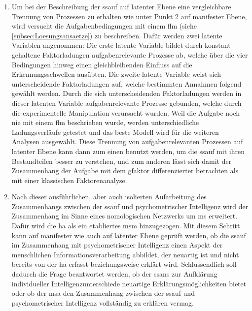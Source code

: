 \documentclass[11pt, twoside, a4paper]{book}		%
\begin{document}
\begin{enumerate}
	\item Um bei der Beschreibung der \gls{ssauf} auf latenter Ebene eine vergleichbare Trennung von Prozessen zu erhalten wie unter Punkt 2 auf manifester Ebene, wird versucht die Aufgabenbedingungen mit einem \gls{flm} (siehe \autoref{subsec:Loesungsansaetze}) zu beschreiben. Dafür werden zwei latente Variablen angenommen: Die erste latente Variable bildet durch konstant gehaltene Faktorladungen aufgabenrelevante Prozesse ab, welche über die vier Bedingungen hinweg einen gleichbleibenden Einfluss auf die Erkennungsschwellen ausübten. Die zweite latente Variable weist sich unterscheidende Faktorladungen auf, welche bestimmten Annahmen folgend gewählt werden. Durch die sich unterscheidenden Faktorladungen werden in dieser latenten Variable aufgabenrelevante Prozesse gebunden, welche durch die experimentelle Manipulation verursacht wurden. Weil die Aufgabe noch nie mit einem \gls{flm} beschrieben wurde, werden unterschiedliche Ladungsverläufe getestet und das beste Modell wird für die weiteren Analysen ausgewählt. Diese Trennung von aufgabenrelevanten Prozessen auf latenter Ebene kann dann zum einen benutzt werden, um die \gls{ssauf} mit ihren Bestandteilen besser zu verstehen, und zum anderen lässt sich damit der Zusammenhang der Aufgabe mit dem \gls{gfaktor} differenzierter betrachten als mit einer klassischen Faktorenanalyse.

	\item Nach dieser ausführlichen, aber auch isolierten Aufarbeitung des Zusammenhangs zwischen der \gls{ssauf} und psychometrischer Intelligenz wird der Zusammenhang im Sinne eines nomologischen Netzwerks \citep{Cronbach1955} um \gls{ms} erweitert. Dafür wird die \gls{ha} als ein etabliertes \gls{msm} hinzugezogen. Mit diesem Schritt kann auf manifester wie auch auf latenter Ebene geprüft werden, ob die \gls{ssauf} im Zusammenhang mit psychometrischer Intelligenz einen Aspekt der menschlichen Informationsverarbeitung abbildet, der neuartig ist und nicht bereits von der \gls{ha} erfasst beziehungsweise erklärt wird. Schlussendlich soll dadurch die Frage beantwortet werden, ob der \gls{ssans} zur Aufklärung individueller Intelligenzunterschiede \citep{Melnick2013} neuartige Erklärungsmöglichkeiten bietet oder ob der \gls{msa} \citep[z.~B.][]{Deary2000a, Jensen1982a, Jensen1982b, Jensen2006, Vernon1983} den Zusammenhang zwischen der \gls{ssauf} und psychometrischer Intelligenz vollständig zu erklären vermag.

\end{enumerate}
\end{document}
